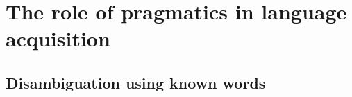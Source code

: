 \documentclass{article} %
\begin{document}




\section{The role of pragmatics in language acquisition}

\subsection{Disambiguation using known words}

\end{document}
